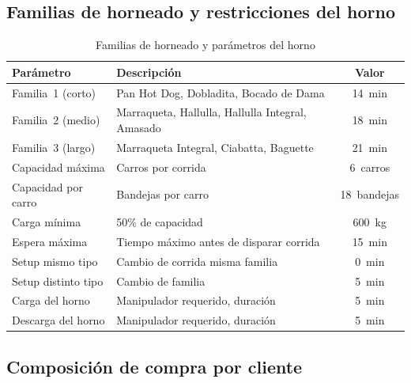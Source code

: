\documentclass[12pt]{article}
\begin{document}
\newpage

\subsection{Familias de horneado y restricciones del horno}

\begin{table}[h!]
\centering
\caption{Familias de horneado y parámetros del horno}
\label{tab:horno}
\renewcommand{\arraystretch}{1.3}
\begin{tabularx}{\textwidth}{lXc}
\toprule
\rowcolor{tabhead}
\color{white}\textbf{Parámetro} & \color{white}\textbf{Descripción} & \color{white}\textbf{Valor} \\
\midrule
\rowcolor{tabrow} Familia~1 (corto)  & Pan Hot Dog, Dobladita, Bocado de Dama & 14~min \\
Familia~2 (medio)                   & Marraqueta, Hallulla, Hallulla Integral, Amasado & 18~min \\
\rowcolor{tabrow} Familia~3 (largo)  & Marraqueta Integral, Ciabatta, Baguette & 21~min \\
Capacidad máxima                    & Carros por corrida & 6~carros \\
\rowcolor{tabrow} Capacidad por carro & Bandejas por carro & 18~bandejas \\
Carga mínima                        & 50\% de capacidad & 600~kg \\
\rowcolor{tabrow} Espera máxima      & Tiempo máximo antes de disparar corrida & 15~min \\
Setup mismo tipo                    & Cambio de corrida misma familia & 0~min \\
\rowcolor{tabrow} Setup distinto tipo & Cambio de familia & 5~min \\
Carga del horno                     & Manipulador requerido, duración & 5~min \\
\rowcolor{tabrow} Descarga del horno  & Manipulador requerido, duración & 5~min \\
\bottomrule
\end{tabularx}
\end{table}


\subsection{Composición de compra por cliente}
\end{document}
